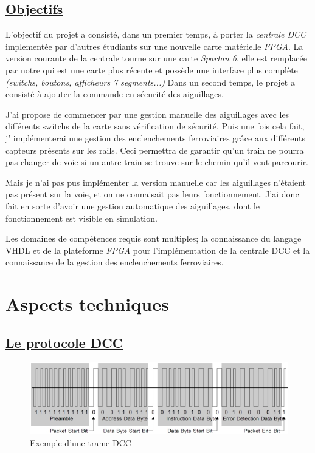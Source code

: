 \subsection{\underline{Objectifs}}

L'objectif du projet a consisté, dans un premier temps, à porter la
\emph{centrale DCC} implement\'ee par d'autres \'etudiants sur une nouvelle
carte mat\'erielle \emph{FPGA}. La version courante de la centrale tourne sur
une carte \emph{Spartan 6}, elle est remplac\'ee par notre \crt qui est
une carte plus r\'ecente et possède une interface plus complète
\emph{(switchs, boutons, afficheurs 7 segments...)}
Dans un second temps, le projet a consisté à ajouter la commande en
sécurité des aiguillages.

J'ai propose de commencer par une gestion manuelle des aiguillages avec
les diff\'erents switchs de la carte sans v\'erification de
s\'ecurit\'e.
Puis une fois cela fait, j' impl\'ementerai une gestion des
enclenchements ferroviaires grâce aux différents capteurs pr\'esents sur
les rails. Ceci permettra de garantir qu'un train ne pourra pas
changer de voie si un autre train se trouve sur le chemin
qu'il veut parcourir. 


Mais je n'ai pas pus implémenter la version manuelle car les
aiguillages n'étaient pas présent sur la voie, et on ne connaisait pas
leurs fonctionnement.
J'ai donc fait en sorte d'avoir une gestion automatique des
aiguillages, dont le fonctionnement est visible en simulation.


Les domaines de comp\'etences requis sont multiples; la connaissance
du langage VHDL et de la plateforme \emph{FPGA} pour l'impl\'ementation
de la centrale DCC et la connaissance de la gestion des enclenchements
ferroviaires.


\newpage
\section{Aspects techniques}
\label{sec:asp_tech}

\subsection{\underline{Le protocole DCC}}
\label{sec:dcc}


\begin{figure}[h]
\centering
\includegraphics[scale=0.75]{trame.png}
\caption{Exemple d'une trame DCC}
\label{fig1}
\end{figure}

